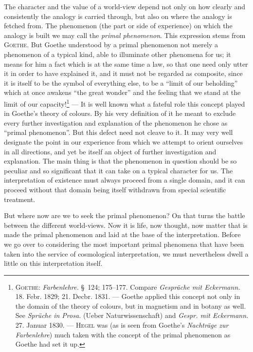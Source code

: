 \documentclass[12pt,a4paper]{book}
\newcommand{\opage}[1]{\marginnote{\footnotesize\textit{[#1]}}}
\begin{document}
The character and the value of a world-view depend not only on how clearly and
consistently the analogy is carried through, but also on where the analogy is
fetched from. The phenomenon (the part or side of experience) on which the
analogy is built we may call the \emph{primal phenomenon}. This expression stems
from \textsc{Goethe}. But Goethe understood by a primal phenomenon not merely a
phenomenon of a typical kind, able to illuminate other phenomena for us; it means
for him a fact which is at the same time a law, so that one need only utter it in
order to have explained it, and it must not be regarded as composite, since it is
itself to be the symbol of everything else, to be a ``limit of our beholding''
which at once awakens ``the great wonder'' and the feeling that we stand at the
limit of our capacity!\footnote{\textsc{Goethe}: \textit{Farbenlehre.} §~124;
175--177. Compare \textit{Gespräche mit Eckermann.} 18. Febr. 1829; 21. Decbr.
1831. --- Goethe applied this concept not only in the domain of the theory of
colours, but in magnetism and in botany as well. See \textit{Sprüche in Prosa.}
(Ueber Naturwissenschaft) and \textit{Gespr. mit Eckermann.} 27. Januar 1830. ---
\textsc{Hegel} was (as is seen from Goethe's \textit{Nachträge zur Farbenlehre})
much taken with the concept of the primal phenomenon as Goethe had set it up.}
--- It is well known what a fateful role this concept played in Goethe's theory
of colours. By his very \opage{57}definition of it he meant to exclude every further
investigation and explanation of the phenomenon he chose as ``primal
phenomenon''. But this defect need not cleave to it. It may very well designate
the point in our experience from which we attempt to orient ourselves in all
directions, and yet be itself an object of further investigation and explanation.
The main thing is that the phenomenon in question should be so peculiar and so
significant that it can take on a typical character for us. The interpretation of
existence must always proceed from a single domain, and it can proceed without
that domain being itself withdrawn from special scientific treatment.

But where now are we to seek the primal phenomenon? On that turns the battle
between the different world-views. Now it is life, now thought, now matter that
is made the primal phenomenon and laid at the base of the interpretation. Before
we go over to considering the most important primal phenomena that have been
taken into the service of cosmological interpretation, we must nevertheless dwell
a little on this interpretation itself.
\end{document}
